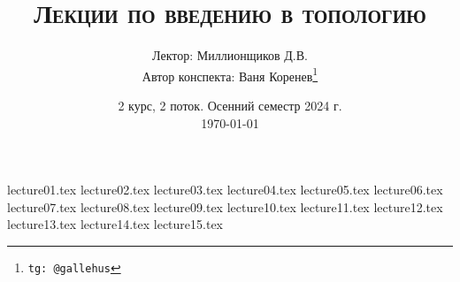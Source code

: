 \documentclass[a4paper]{article}
\title{\scshape {Лекции по введению в топологию}}
\date{2 курс, 2 поток. Осенний семестр 2024 г. \\ \today}
\author{Лектор: Миллионщиков Д.В. \\ Автор конспекта: Ваня Коренев\thanks{\texttt{tg: @gallehus}}}
\begin{document}
\maketitle
\newpage
\tableofcontents

\newpage

{lecture01.tex}
{lecture02.tex}
{lecture03.tex}
{lecture04.tex}
{lecture05.tex}
{lecture06.tex}
{lecture07.tex}
{lecture08.tex}
{lecture09.tex}
{lecture10.tex}
{lecture11.tex}
{lecture12.tex}
{lecture13.tex}
{lecture14.tex}
{lecture15.tex}
\end{document}
